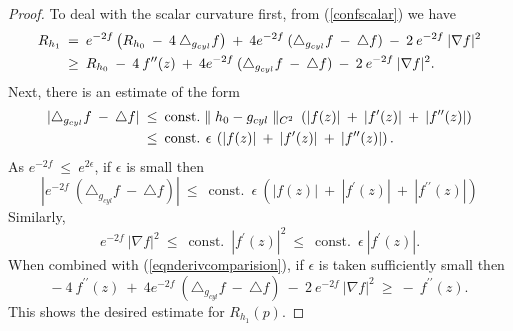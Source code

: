 \documentclass[12pt]{amsart}
\newcommand{\const}{\operatorname{const.}}
\numberwithin{equation}{section}
\theoremstyle{plain}
\theoremstyle{definition}
\theoremstyle{remark}
\begin{document}
\begin{proof}
To deal with the scalar curvature first, from (\ref{confscalar}) we have
\begin{align}
R_{h_1} \: & = \: e^{-2f} \left( R_{h_0} \: - \: 4 \: \triangle_{g_{cyl}} f \right) \: + \:
4 e^{-2f}  \: (\triangle_{g_{cyl}} f \: - \: \triangle f) \:- \: 2 \: e^{-2f} \: |\nabla f|^2 \\
& \ge \: R_{h_0} \: - \: 4 \: f^{\prime \prime}(z)  \: + \:
4 e^{-2f}  \: (\triangle_{g_{cyl}} f \: - \: \triangle f) \:- \: 2 \: e^{-2f} \: |\nabla f|^2. \notag
\end{align}
Next, there is an estimate of the form
\begin{align}
|\triangle_{g_{cyl}} f \: - \: \triangle f| \: & \le \: \const \parallel h_0 - g_{cyl}
\parallel_{C^2} \: \left( |f(z)| \: + \: |f^\prime(z)| \: + \:
|f^{\prime \prime}(z)| \right) \\
& \le \:
\const \: \epsilon \: \left( |f(z)| \: + \: |f^\prime(z)| \: + \:
|f^{\prime \prime}(z)| \right). \notag
\end{align}
As $e^{-2f} \: \le \: e^{2 \epsilon}$, if $\epsilon$ is small then 
\begin{equation}
\left| e^{-2f}  \: (\triangle_{g_{cyl}} f \: - \: \triangle f) \right| \: \le \: \const \:
\epsilon \: \left( |f(z)| \: + \: |f^\prime(z)| \: + \:
|f^{\prime \prime}(z)| \right)
\end{equation}
Similarly, 
\begin{equation}
e^{-2f} \: |\nabla f|^2 \: \le \: \const  \: 
|f^\prime(z)|^2 \: \le \: \const \: \epsilon \: |f^\prime(z)|.
\end{equation}
When combined with (\ref{eqnderivcomparision}), if $\epsilon$ is taken
sufficiently small
then
\begin{equation}
- \: 4 \: f^{\prime \prime}(z)  \: + \:
4 e^{-2f}  \: (\triangle_{g_{cyl}} f \: - \: \triangle f) \:- \: 2 \: e^{-2f} \: |\nabla f|^2
\: \ge \: - \: f^{\prime \prime}(z).
\end{equation}
This shows the desired estimate for $R_{h_1}(p)$.


\end{proof}
\end{document}
